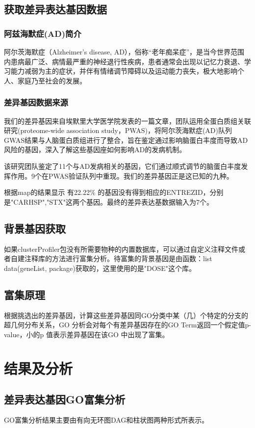 \documentclass{article}
\begin{document}
\subsection{获取差异表达基因数据}
\subsubsection{阿兹海默症(AD)简介}
阿尔茨海默症（Alzheimer's disease, AD），俗称“老年痴呆症”，是当今世界范围内患病最广泛、病情最严重的神经退行性疾病，患者通常会出现以记忆力衰退、学习能力减弱为主的症状，并伴有情绪调节障碍以及运动能力丧失，极大地影响个人、家庭乃至社会的发展。
\subsubsection{差异基因数据来源}
我们的差异基因来自埃默里大学医学院发表的一篇文章，团队运用全蛋白质组关联研究(proteome-wide association study，PWAS)，将阿尔茨海默症(AD)队列 GWAS结果与人脑蛋白质组进行了整合，旨在鉴定通过影响脑蛋白丰度而导致AD风险的基因，深入了解这些基因座如何影响AD的发病机制\cite{2020Integrating}。\par
该研究团队鉴定了11个与AD发病相关的基因，它们通过顺式调节的脑蛋白丰度发挥作用。9个在PWAS验证队列中重现。我们的差异基因正是这已知的九种。\par
根据map的结果显示 有22.22\% 的基因没有得到相应的ENTREZID，分别是"CARHSP","STX"这两个基因。最终的差异表达基数据输入为7个。
\subsection{背景基因获取}
如果clusterProfiler包没有所需要物种的内置数据库，可以通过自定义注释文件或者自建注释库的方法进行富集分析。待富集的背景基因是由函数：list data(geneList, package)获取的，这里使用的是"DOSE"这个库。
\subsection{富集原理}
根据挑选出的差异基因，计算这些差异基因同GO分类中某（几）个特定的分支的超几何分布关系，GO 分析会对每个有差异基因存在的GO Term返回一个假定值p-value，小的p 值表示差异基因在该GO 中出现了富集。
\section{结果及分析}
\subsection{差异表达基因GO富集分析}
GO富集分析结果主要由有向无环图DAG和柱状图两种形式所表示。
\end{document}
